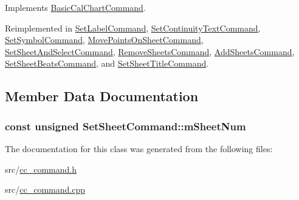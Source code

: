 Implements \hyperlink{a00018_ab6f65965601103020ea8276abf88313a}{Basic\-Cal\-Chart\-Command}.



Reimplemented in \hyperlink{a00127_a1b03e239de9656b4fabe64f52ef502bb}{Set\-Label\-Command}, \hyperlink{a00124_a8545ed7f5c3ca572042c4a0abc8c2491}{Set\-Continuity\-Text\-Command}, \hyperlink{a00137_ac01aa3b3a02f3a8db5b16e9cbb1c3228}{Set\-Symbol\-Command}, \hyperlink{a00112_a2339b105a336b22d59771534a3f4a304}{Move\-Points\-On\-Sheet\-Command}, \hyperlink{a00132_ae017079a0a6c65222f10968fad8fc082}{Set\-Sheet\-And\-Select\-Command}, \hyperlink{a00122_ac289d6c5166a7139fa0c61c664d1710e}{Remove\-Sheets\-Command}, \hyperlink{a00001_aba46cac1335e29189a9aaf5b50d3f364}{Add\-Sheets\-Command}, \hyperlink{a00133_a9efb63e15dae7c253792ae214feda42e}{Set\-Sheet\-Beats\-Command}, and \hyperlink{a00135_ab2e45d322adbc00b829917145585e152}{Set\-Sheet\-Title\-Command}.



\subsection{Member Data Documentation}
\hypertarget{a00134_a12f42cb2ab2f659c8b1e097a2200d034}{
\subsubsection[{m\-Sheet\-Num}]{\setlength{\rightskip}{0pt plus 5cm}const unsigned Set\-Sheet\-Command\-::m\-Sheet\-Num\hspace{0.3cm}{\ttfamily [protected]}}}\label{a00134_a12f42cb2ab2f659c8b1e097a2200d034}


The documentation for this class was generated from the following files\-:\begin{DoxyCompactItemize}
\item 
src/\hyperlink{a00183}{cc\-\_\-command.\-h}\item 
src/\hyperlink{a00182}{cc\-\_\-command.\-cpp}\end{DoxyCompactItemize}
